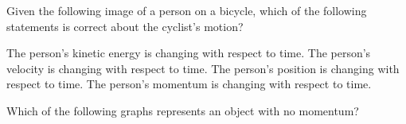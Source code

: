 \documentclass[answers]{exam}
\begin{document}
\begin{questions}
\question 
Given the following image of a person on a bicycle, which of the following statements is correct about the cyclist’s motion?


\begin{center}
\end{center}

\begin{randomizechoices}
    \choice The person’s kinetic energy is changing with respect to time.
    \choice The person’s velocity is changing with respect to time.
    \correctchoice The person’s position is changing with respect to time.
    \choice The person’s momentum is changing with respect to time.
\end{randomizechoices}

\question 
Which of the following graphs represents an object with no momentum?


\end{questions}
\end{document}
